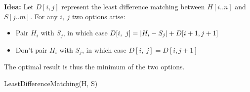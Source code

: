 \documentclass[12pt]{article}
\newenvironment{question}[2][Question]{\begin{trivlist}
\item[\hskip \labelsep {\bfseries #1}\hskip \labelsep {\bfseries #2.}]}{\end{trivlist}}
\DeclarePairedDelimiter\abs{\lvert}{\rvert}%
\begin{document}
\begin{question}{2 (a)}
\end{question}

\begin{question}{2 (b)}
  \leavevmode \\ \\
  \textbf{Idea:} Let $D[i, j]$ represent the least difference matching between
  $H[i..n]$ and $S[j..m]$.  For any $i,\ j$ two options arise:
  \begin{itemize}
    \item Pair $H_{i}$ with $S_{j}$, in which case $D[i,\ j] = \abs{H_{i} - S_{j}} + D[i + 1, j + 1]$
    \item Don't pair $H_{i}$ with $S_{j}$, in which case $D[i,\ j] = D[i, j + 1]$
  \end{itemize}
  The optimal result is thus the minimum of the two options.

  \begin{algorithm}[H]
    \caption{LeastDifferenceMatching(H, S)}
    \BlankLine

  \end{algorithm}
\end{question}
\end{document}
